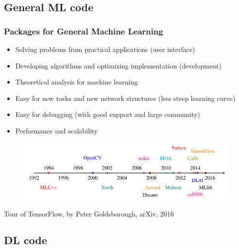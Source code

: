 \subsection{General ML code}

\begin{frame}
  \MyLogo
  \frametitle{Packages for General Machine Learning}  
\small

\begin{itemize}
\item Solving problems from practical applications (user interface)
\item Developing algorithms and optimizing implementation (development)
\item Theoretical analysis for machine learning
\end{itemize}

\begin{itemize}
\item Easy for new tasks and new network structures (less steep learning curve)
\item Easy for debugging (with good support and large community)
\item Performance and scalability
\end{itemize}

\vskip -12pt
\begin{figure}[htbp] %
   \centering
   \includegraphics[width=0.9\linewidth]{figures/ML.pdf} 
\end{figure}

\begin{center}
{\color{red} \scriptsize
Tour of TensorFlow, by Peter Goldsborough, arXiv, 2016}
\end{center}


\end{frame}

\subsection{DL code}

